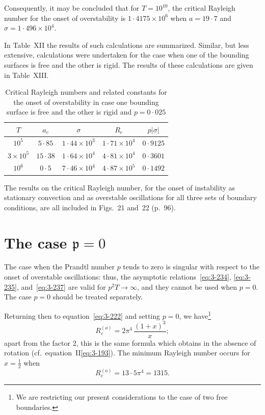 Consequently, it may be concluded that for $T = 10^{10}$, the critical Rayleigh number for the onset of overstability is $1{\cdot}4175 \times 10^6$ when $a = 19{\cdot}7$ and $\sigma = 1{\cdot}496 \times 10^4$.

In Table~XII the results of such calculations are summarized. Similar, but less extensive, calculations were undertaken for the case when one of the bounding surfaces is free and the other is rigid. The results of these calculations are given in Table~XIII.

\begin{table}[ht]
\centering
\caption{Critical Rayleigh numbers and related constants for the onset of overstability in case one bounding surface is free and the other is rigid and $p = 0{\cdot}025$}
\label{tab:XIII}
\small
\begin{tabular}{ccccc}
\hline
$T$ & $a_c$ & $\sigma$ & $R_c$ & $p|\sigma|$ \\
\hline
$10^5$ & $5{\cdot}85$ & $1{\cdot}44 \times 10^3$ & $1{\cdot}71 \times 10^4$ & $0{\cdot}9125$ \\
$3 \times 10^5$ & $15{\cdot}38$ & $1{\cdot}64 \times 10^4$ & $4{\cdot}81 \times 10^4$ & $0{\cdot}3601$ \\
$10^6$ & $0{\cdot}5$ & $7{\cdot}46 \times 10^4$ & $4{\cdot}87 \times 10^5$ & $0{\cdot}1492$ \\
\hline
\end{tabular}
\end{table}

The results on the critical Rayleigh number, for the onset of instability as stationary convection and as overstable oscillations for all three sets of boundary conditions, are all included in Figs.~21 and~22 (p.~96).

\section{The case $\mathfrak{p} = 0$}\label{sec:3-32}

The case when the Prandtl number $p$ tends to zero is singular with respect to the onset of overstable oscillations: thus, the asymptotic relations~\eqref{eq:3-234}, \eqref{eq:3-235}, and~\eqref{eq:3-237} are valid for $p^2 T \to \infty$, and they cannot be used when $p = 0$. The case $p = 0$ should be treated separately.

Returning then to equation~\eqref{eq:3-222} and setting $p = 0$, we have\footnote{We are restricting our present considerations to the case of two free boundaries.}
\begin{equation}\label{eq:3-277}
R_c^{(o)} = 2\pi^4\,\frac{(1+x)^3}{x};
\end{equation}
apart from the factor 2, this is the same formula which obtains in the absence of rotation (cf.\ equation~II\;\eqref{eq:3-193}). The minimum Rayleigh number occurs for $x = \frac{1}{2}$ when
\begin{equation}\label{eq:3-278}
R_c^{(o)} = 13{\cdot}5\pi^4 = 1315.
\end{equation}

